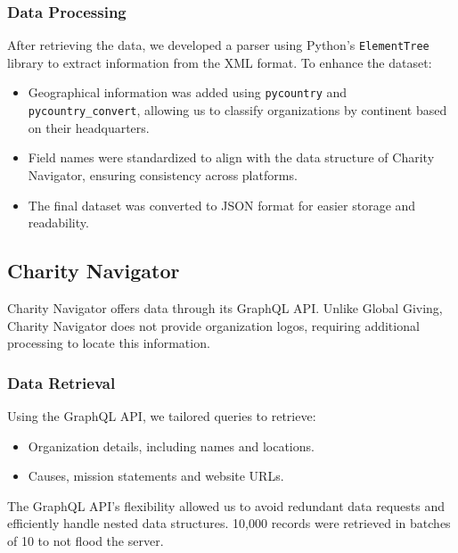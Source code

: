 \documentclass[unicode,9pt,a4paper,oneside,numbers=endperiod,openany]{scrartcl}
\begin{document}
\subsubsection{Data Processing}

After retrieving the data, we developed a parser using Python's \texttt{ElementTree} library to extract information from the XML format. To enhance the dataset:
\begin{itemize}
    \item Geographical information was added using \texttt{pycountry} and \texttt{pycountry\_convert}, allowing us to classify organizations by continent based on their headquarters.
    \item Field names were standardized to align with the data structure of Charity Navigator, ensuring consistency across platforms.
    \item The final dataset was converted to JSON format for easier storage and readability.
\end{itemize}

\subsection{Charity Navigator}
Charity Navigator offers data through its GraphQL API. Unlike Global Giving, Charity Navigator does not provide organization logos, requiring additional processing to locate this information.

\subsubsection{Data Retrieval}
Using the GraphQL API, we tailored queries to retrieve:
\begin{itemize}
    \item Organization details, including names and locations.
    \item Causes, mission statements and website URLs.
\end{itemize}
The GraphQL API's flexibility allowed us to avoid redundant data requests and efficiently handle nested data structures. 10,000 records were retrieved in batches of 10 to not flood the server.
\end{document}
